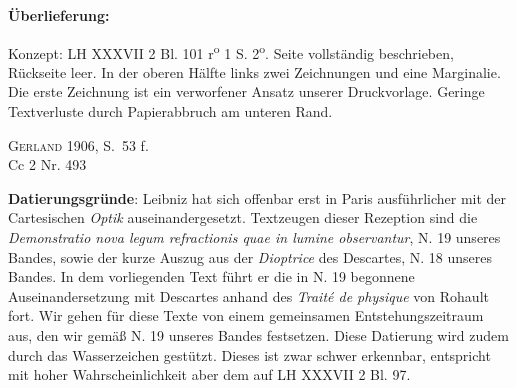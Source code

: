       
               
                \begin{ledgroupsized}[r]{120mm}
                \footnotesize 
                \pstart                
                \noindent\textbf{\"{U}berlieferung:}   
                \pend
                \end{ledgroupsized}
            
              
                            \begin{ledgroupsized}[r]{114mm}
                            \footnotesize 
                            \pstart \parindent -6mm
                            Konzept: LH XXXVII 2 Bl. 101 r\textsuperscript{o} 1 S. 2\textsuperscript{o}. Seite vollst\"{a}ndig beschrieben, R\"{u}ckseite leer. In der oberen H\"{a}lfte links zwei Zeichnungen und eine Marginalie. Die erste Zeichnung ist ein verworfener Ansatz unserer Druckvorlage. Geringe Textverluste durch Papierabbruch am unteren Rand. \pend
                            \end{ledgroupsized}
              
                            \begin{ledgroupsized}[r]{114mm}
                            \footnotesize 
                            \pstart \parindent -6mm
                            \cite{00243}\textsc{Gerland} 1906, S.~53 f.\\Cc 2 Nr. 493 \pend
                            \end{ledgroupsized}
                \vspace*{5mm}
                \begin{ledgroup}
                \footnotesize 
                \pstart
            \noindent\footnotesize{\textbf{Datierungsgr\"{u}nde}: Leibniz hat sich offenbar erst in Paris ausf\"{u}hrlicher mit der Cartesischen \cite{00038}\textit{Optik} auseinandergesetzt. Textzeugen dieser Rezeption sind die \textit{Demonstratio nova legum refractionis quae in lumine observantur}, N. 19 unseres Bandes, sowie der kurze Auszug aus der \cite{00038}\textit{Dioptrice} des Descartes, N. 18 unseres Bandes. In dem vorliegenden Text f\"{u}hrt er die in N. 19 begonnene Auseinandersetzung mit Descartes anhand des \cite{00087}\textit{Trait\'{e} de physique} von Rohault fort. Wir gehen f\"{u}r diese Texte von einem gemeinsamen Entstehungszeitraum aus, den wir gem\"{a}ß N. 19 unseres Bandes festsetzen. Diese Datierung wird zudem durch das Wasserzeichen gest\"{u}tzt. Dieses ist zwar schwer erkennbar, entspricht mit hoher Wahrscheinlichkeit aber dem auf LH XXXVII 2 Bl. 97.}
                \pend
                \end{ledgroup}
            
